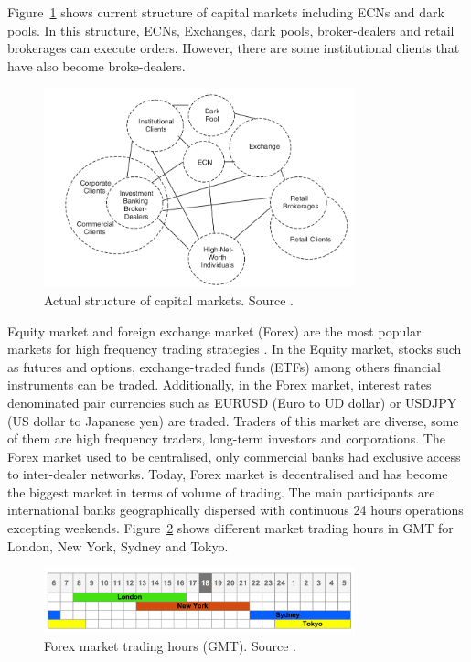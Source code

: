 Figure~\ref{fig:capitalmarketnow} shows current structure of capital markets
including ECNs and dark pools. In this structure, ECNs, Exchanges, dark pools,
broker-dealers and retail brokerages can execute orders. However, there are some
institutional clients that have also become broke-dealers.

\begin{figure}[!h]
  \centering
  \includegraphics[width=0.8\textwidth]{img/capitalmarketsnow}
  \caption{Actual structure of capital markets. Source \cite{aldridge2009}.}
  \label{fig:capitalmarketnow}
\end{figure}


Equity market and foreign exchange market (Forex) are the most popular markets
for high frequency trading strategies \cite{genccay2001introduction}. In the
Equity market, stocks such as futures and options, exchange-traded funds (ETFs)
among others financial instruments can be traded. Additionally, in the Forex
market, interest rates denominated pair currencies such as EURUSD (Euro to UD
dollar) or USDJPY (US dollar to Japanese yen) are traded. Traders of this
market are diverse, some of them are high frequency traders, long-term
investors and corporations. The Forex market used to be centralised, only
commercial banks had exclusive access to inter-dealer networks. Today, Forex
market is decentralised and has become the biggest market in terms of volume of
trading. The main participants are international banks geographically dispersed
with continuous 24 hours operations excepting weekends.
Figure~\ref{fig:Forextimes} shows different market trading hours in GMT for
London, New York, Sydney and Tokyo.

\begin{figure}[!h]
  \centering
  \includegraphics[width=0.8\textwidth]{img/forex-trading-hours.png}
  \caption{Forex market trading hours (GMT). Source \cite{dailyprice}.}
  \label{fig:Forextimes}
\end{figure}


